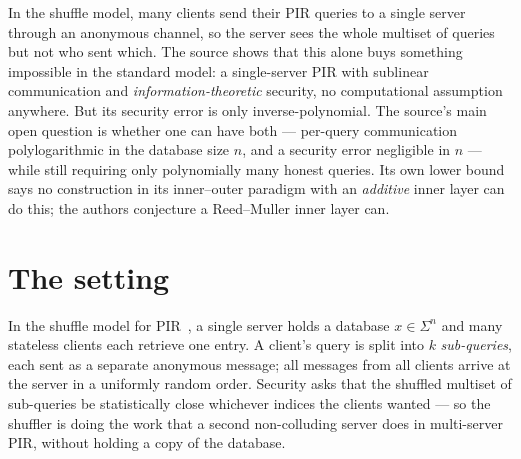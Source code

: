 \documentclass{conjura-conjecture}
\newcommand{\Sig}{\Sigma}
\begin{document}

\vspace{0.4em}

\begin{informalconjecture}
In the shuffle model, many clients send their PIR queries to a single
server through an anonymous channel, so the server sees the whole
multiset of queries but not who sent which. The source shows that this
alone buys something impossible in the standard model: a single-server
PIR with sublinear communication and \emph{information-theoretic}
security, no computational assumption anywhere. But its security error
is only inverse-polynomial. The source's main open question is whether
one can have both --- per-query communication polylogarithmic in the
database size $n$, and a security error negligible in $n$ --- while
still requiring only polynomially many honest queries. Its own lower
bound says no construction in its inner--outer paradigm with an
\emph{additive} inner layer can do this; the authors conjecture a
Reed--Muller inner layer can.
\end{informalconjecture}

\section{The setting}\label{sec:setting}

In the shuffle model for PIR~\cite{IKOS06,GIK+24}, a single server holds
a database $x \in \Sig^{n}$ and many stateless clients each retrieve one
entry. A client's query is split into $k$ \emph{sub-queries}, each sent
as a separate anonymous message; all messages from all clients arrive at
the server in a uniformly random order. Security asks that the shuffled
multiset of sub-queries be statistically close whichever indices the
clients wanted --- so the shuffler is doing the work that a second
non-colluding server does in multi-server PIR, without holding a copy of
the database.
\end{document}
